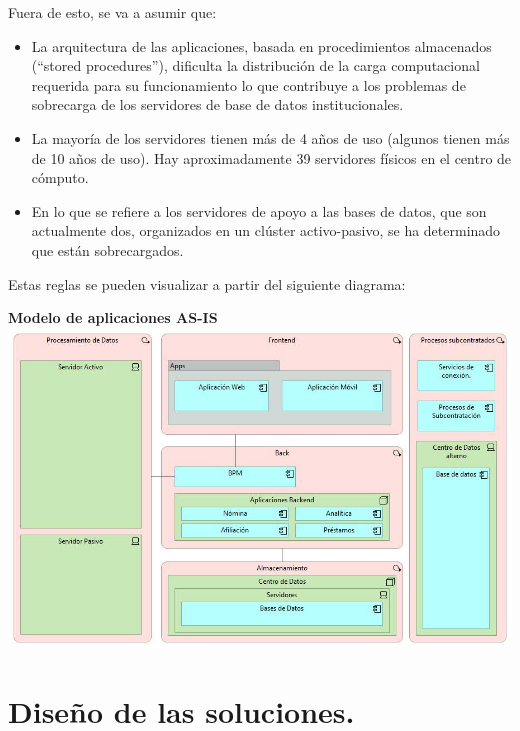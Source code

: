 \documentclass[a4paper]{article}
\begin{document}
Fuera de esto, se va a asumir que:

\begin{itemize}
    \item La arquitectura de las aplicaciones, basada en procedimientos almacenados (“stored procedures”), dificulta la
    distribución de la carga computacional requerida para su funcionamiento lo que contribuye a los problemas de
    sobrecarga de los servidores de base de datos institucionales.
    \item La mayoría de los servidores tienen más de 4 años de uso (algunos tienen más de 10 años de uso). Hay
    aproximadamente 39 servidores físicos en el centro de cómputo.
    \item En lo que se refiere a los servidores de apoyo a las bases de datos, que son actualmente dos, organizados en
    un clúster activo-pasivo, se ha determinado que están sobrecargados.
\end{itemize}

Estas reglas se pueden visualizar a partir del siguiente diagrama:
\begin{center}
    \textbf{Modelo de aplicaciones AS-IS}
    \includegraphics[scale=0.56]{as-is.jpg}    
\end{center}

\section{Diseño de las soluciones.}
\end{document}
